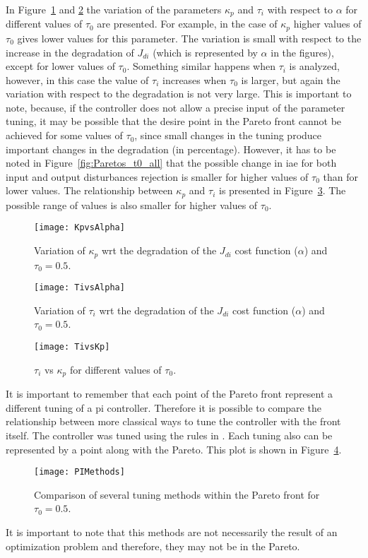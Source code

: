 In Figure~\ref{fig:KpvsAlpha} and \ref{fig:TivsAlpha} the variation of the parameters $\kappa_p$ and $\tau_i$ with respect to $\alpha$ for different values of $\tau_0$ are presented. For example, in the case of $\kappa_p$ higher values of $\tau_0$ gives lower values for this parameter. The variation is small with respect to the increase in the degradation of $J_{di}$ (which is represented by $\alpha$ in the figures), except for lower values of $\tau_0$. Something similar happens when $\tau_i$ is analyzed, however, in this case the value of $\tau_i$ increases when $\tau_0$ is larger, but again the variation with respect to the degradation is not very large. This is important to note, because, if the controller does not allow a precise input of the parameter tuning, it may be possible that the desire point in the Pareto front cannot be achieved for some values of $\tau_0$, since small changes in the tuning produce important changes in the degradation (in percentage). However, it has to be noted in Figure~\ref{fig:Paretos_t0_all} that the possible change in \gls{iae} for both input and output disturbances rejection is smaller for higher values of $\tau_0$ than for lower values. The relationship between $\kappa_p$ and $\tau_i$ is presented in Figure~\ref{fig:TivsKp}. The possible range of values is also smaller for higher values of $\tau_0$. 
%
\begin{figure}%
\centering
\texttt{[image: KpvsAlpha]}%
\caption{Variation of $\kappa_p$ wrt the degradation of the $J_{di}$ cost function ($\alpha$) and $\tau_0=0.5$.}%
\label{fig:KpvsAlpha}%
\end{figure}
%
\begin{figure}%
\centering
\texttt{[image: TivsAlpha]}%
\caption{Variation of $\tau_i$ wrt the degradation of the $J_{di}$ cost function ($\alpha$) and $\tau_0=0.5$.}%
\label{fig:TivsAlpha}%
\end{figure}
%
\begin{figure}%
\centering
\texttt{[image: TivsKp]}%
\caption{$\tau_i$ vs $\kappa_p$ for different values of $\tau_0$.}%
\label{fig:TivsKp}%
\end{figure}
%

It is important to remember that each point of the Pareto front represent a different tuning of a \gls{pi} controller. Therefore it is possible to compare the relationship between more classical ways to tune the controller with the front itself. The controller was tuned using the rules in \citet{ODwyer2000,Astrom1995,Murril1967,Rovira1969,Grimholt2012, Smith1985, Ziegler1942}. Each tuning also can be represented by a point along with the Pareto. This plot is shown in Figure~\ref{fig:PIMethods}. %
%
\begin{figure}%
	\centering
	\texttt{[image: PIMethods]}%
	\caption{Comparison of several tuning methods within the Pareto front for $\tau_0=0.5$.}%
	\label{fig:PIMethods}%
\end{figure}
%
It is important to note that this methods are not necessarily the result of an optimization problem and therefore, they may not be in the Pareto.

